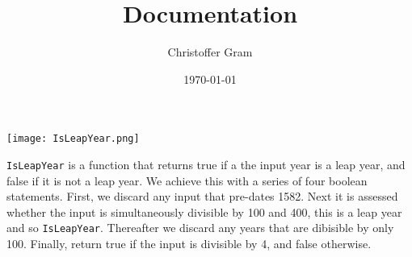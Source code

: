\documentclass{article}
\title{Documentation}
\author{Christoffer Gram}
\date{\today}
\begin{document}
    \maketitle
    \texttt{[image: IsLeapYear.png]}

    \texttt{IsLeapYear} is a function that returns true if a the input year is a leap year, and false if it is not a
    leap year. We achieve this with a series of four boolean statements. First, we discard any input that pre-dates
    1582. Next it is assessed whether the input is simultaneously divisible by 100 and 400, this is a leap year and so
    \texttt{IsLeapYear}. Thereafter we discard any years that are dibisible by only 100. Finally, return true if the input
    is divisible by 4, and false otherwise.  
\end{document}
